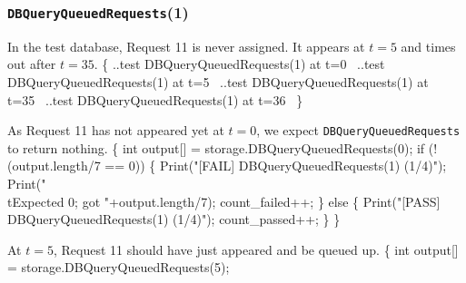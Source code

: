 \documentclass{article}
\def\nwendcode{\endtrivlist \endgroup}
\let\nwdocspar=\par
\begin{document}
\subsubsection{{\tt{}DBQueryQueuedRequests}(1)}
In the test database, Request 11 is never assigned. It appears
at $t=5$ and times out after $t=35$.
\nwenddocs{}\endmoddef{}
\{
  \LA{}..test \code{}DBQueryQueuedRequests\edoc{}(1) at t=0~{\nwtagstyle{}}\RA{}
  \LA{}..test \code{}DBQueryQueuedRequests\edoc{}(1) at t=5~{\nwtagstyle{}}\RA{}
  \LA{}..test \code{}DBQueryQueuedRequests\edoc{}(1) at t=35~{\nwtagstyle{}}\RA{}
  \LA{}..test \code{}DBQueryQueuedRequests\edoc{}(1) at t=36~{\nwtagstyle{}}\RA{}
\}
\nwendcode{}\nwdocspar
As Request 11 has not appeared yet at $t=0$, we expect
{\tt{}DBQueryQueuedRequests} to return nothing.
\nwenddocs{}\endmoddef{}
\{
  int output[] = storage.DBQueryQueuedRequests(0);
  if (!(output.length/7 == 0)) \{
    Print("[FAIL] DBQueryQueuedRequests(1) (1/4)");
    Print("\\tExpected 0; got "+output.length/7);
    count_failed++;
  \} else \{
    Print("[PASS] DBQueryQueuedRequests(1) (1/4)");
    count_passed++;
  \}
\}
\nwendcode{}\nwdocspar
At $t=5$, Request 11 should have just appeared and be queued up.
\nwenddocs{}\endmoddef{}
\{
  int output[] = storage.DBQueryQueuedRequests(5);
\end{document}
